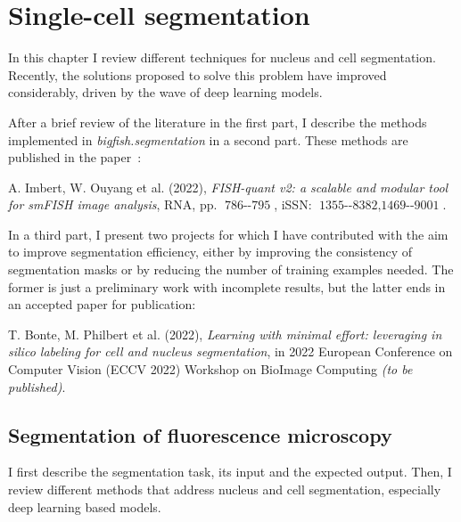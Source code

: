 
\graphicspath{{./figures/chapter3/}}

\chapter{Single-cell segmentation}
\label{ch:chapter3}

\minitoc
\newpage

In this chapter I review different techniques for nucleus and cell segmentation.
Recently, the solutions proposed to solve this problem have improved considerably, driven by the wave of deep learning models.

After a brief review of the literature in the first part, I describe the methods implemented in \emph{bigfish.segmentation} in a second part.
These methods are published in the paper~\cite{Imbert_fq_2022}:

\begin{center}
	\color{green}
	A. Imbert, W. Ouyang et al. (2022), \textit{FISH-quant v2: a scalable and modular tool for smFISH image analysis}, RNA, pp. $\operatorname{786--795}$, iSSN: $\operatorname{1355--8382, 1469--9001}$.
\end{center}

In a third part, I present two projects for which I have contributed with the aim to improve segmentation efficiency, either by improving the consistency of segmentation masks or by reducing the number of training examples needed.
The former is just a preliminary work with incomplete results, but the latter ends in an accepted paper for publication:


\begin{center}
	\color{green}
	T. Bonte, M. Philbert et al. (2022), \textit{Learning with minimal effort: leveraging in silico labeling for cell and nucleus segmentation}, in 2022 European Conference on Computer Vision (ECCV 2022) Workshop on BioImage Computing \textit{(to be published)}.
\end{center}

\section{Segmentation of fluorescence microscopy}
\label{sec:segmentation_introduction}

I first describe the segmentation task, its input and the expected output.
Then, I review different methods that address nucleus and cell segmentation, especially deep learning based models.

